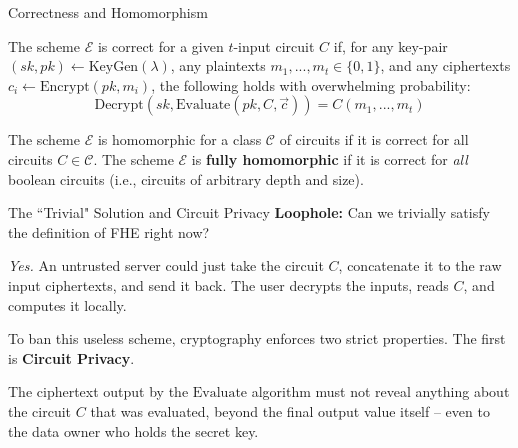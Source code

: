 \documentclass[10pt,handout]{beamer}
\newtheorem{intuition}{Intuition}
\begin{document}
\begin{frame}{Correctness and Homomorphism}
    \begin{definition}
    The scheme $\mathcal{E}$ is correct for a given $t$-input circuit $C$ if, for any key-pair $(sk,pk)\leftarrow \text{KeyGen}(\lambda)$, any plaintexts $m_{1},...,m_{t}\in\{0,1\}$, and any ciphertexts $c_{i}\leftarrow \text{Encrypt}(pk,m_{i})$, the following holds with overwhelming probability:
    $$\text{Decrypt}(sk,\text{Evaluate}(pk,C,\vec{c}))=C(m_{1},...,m_{t})$$
    \end{definition}
    \pause

    \vspace{0.3cm}
    \begin{definition}
    The scheme $\mathcal{E}$ is homomorphic for a class $\mathcal{C}$ of circuits if it is correct for all circuits $C\in\mathcal{C}$. The scheme $\mathcal{E}$ is \textbf{fully homomorphic} if it is correct for \textit{all} boolean circuits (i.e., circuits of arbitrary depth and size).
    \end{definition}
\end{frame}

\begin{frame}{The ``Trivial" Solution and Circuit Privacy}
    \textbf{Loophole:} Can we trivially satisfy the definition of FHE right now? 
    \pause
    
    \textit{Yes.} An untrusted server could just take the circuit $C$, concatenate it to the raw input ciphertexts, and send it back. The user decrypts the inputs, reads $C$, and computes it locally.
    \pause
    
    To ban this useless scheme, cryptography enforces two strict properties. The first is \textbf{Circuit Privacy}.
    \pause

    \begin{definition}
    The ciphertext output by the $\text{Evaluate}$ algorithm must not reveal anything about the circuit $C$ that was evaluated, beyond the final output value itself -- even to the data owner who holds the secret key.
    \end{definition}
    \pause

\end{frame}
\end{document}
